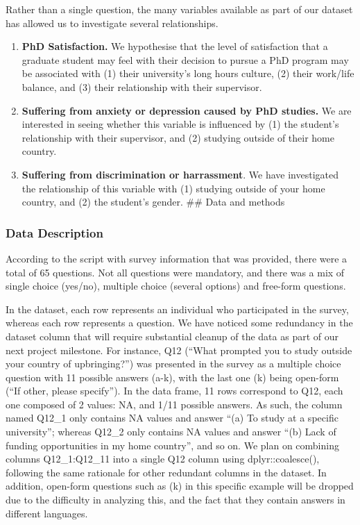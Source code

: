 \documentclass[
]{article}
\begin{document}
Rather than a single question, the many variables available as part of
our dataset has allowed us to investigate several relationships.

\begin{enumerate}
\def\labelenumi{\arabic{enumi}.}
\item
  \textbf{PhD Satisfaction.} We hypothesise that the level of
  satisfaction that a graduate student may feel with their decision to
  pursue a PhD program may be associated with (1) their university's
  long hours culture, (2) their work/life balance, and (3) their
  relationship with their supervisor.
\item
  \textbf{Suffering from anxiety or depression caused by PhD studies.}
  We are interested in seeing whether this variable is influenced by (1)
  the student's relationship with their supervisor, and (2) studying
  outside of their home country.
\item
  \textbf{Suffering from discrimination or harrassment}. We have
  investigated the relationship of this variable with (1) studying
  outside of your home country, and (2) the student's gender. \#\# Data
  and methods
\end{enumerate}

\hypertarget{data-description}{%
\subsubsection{Data Description}\label{data-description}}

According to the script with survey information that was provided, there
were a total of 65 questions. Not all questions were mandatory, and
there was a mix of single choice (yes/no), multiple choice (several
options) and free-form questions.

In the dataset, each row represents an individual who participated in
the survey, whereas each row represents a question. We have noticed some
redundancy in the dataset column that will require substantial cleanup
of the data as part of our next project milestone. For instance, Q12
(``What prompted you to study outside your country of upbringing?'') was
presented in the survey as a multiple choice question with 11 possible
answers (a-k), with the last one (k) being open-form (``If other, please
specify''). In the data frame, 11 rows correspond to Q12, each one
composed of 2 values: NA, and 1/11 possible answers. As such, the column
named Q12\_1 only contains NA values and answer ``(a) To study at a
specific university''; whereas Q12\_2 only contains NA values and answer
``(b) Lack of funding opportunities in my home country'', and so on. We
plan on combining columns Q12\_1:Q12\_11 into a single Q12 column using
dplyr::coalesce(), following the same rationale for other redundant
columns in the dataset. In addition, open-form questions such as (k) in
this specific example will be dropped due to the difficulty in analyzing
this, and the fact that they contain answers in different languages.
\end{document}
